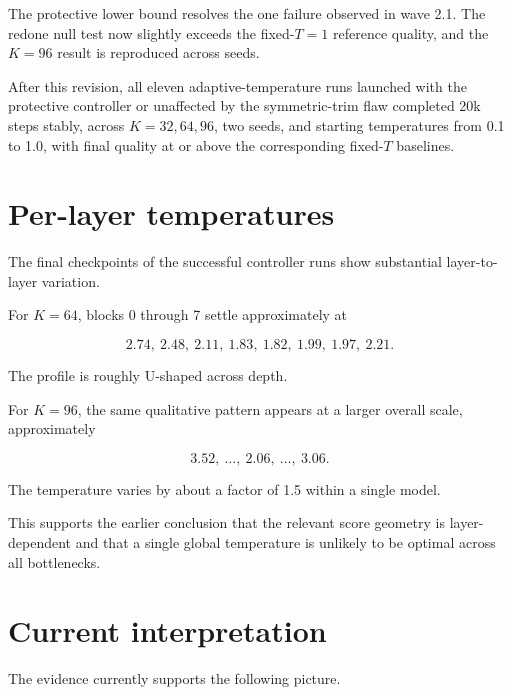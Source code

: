 \documentclass[11pt,a4paper]{article}
\begin{document}
The protective lower bound resolves the one failure observed in wave 2.1.
The redone null test now slightly exceeds the fixed-\(T=1\) reference
quality, and the \(K=96\) result is reproduced across seeds.

After this revision, all eleven adaptive-temperature runs launched with the
protective controller or unaffected by the symmetric-trim flaw completed 20k
steps stably, across \(K=32,64,96\), two seeds, and starting temperatures
from 0.1 to 1.0, with final quality at or above the corresponding fixed-\(T\)
baselines.


\section{Per-layer temperatures}

The final checkpoints of the successful controller runs show substantial
layer-to-layer variation.

For \(K=64\), blocks 0 through 7 settle approximately at

\[
2.74,\ 2.48,\ 2.11,\ 1.83,\ 1.82,\ 1.99,\ 1.97,\ 2.21.
\]

The profile is roughly U-shaped across depth.

For \(K=96\), the same qualitative pattern appears at a larger overall scale,
approximately

\[
3.52,\ \ldots,\ 2.06,\ \ldots,\ 3.06.
\]

The temperature varies by about a factor of 1.5 within a single model.

This supports the earlier conclusion that the relevant score geometry is
layer-dependent and that a single global temperature is unlikely to be
optimal across all bottlenecks.


\section{Current interpretation}

The evidence currently supports the following picture.
\end{document}
